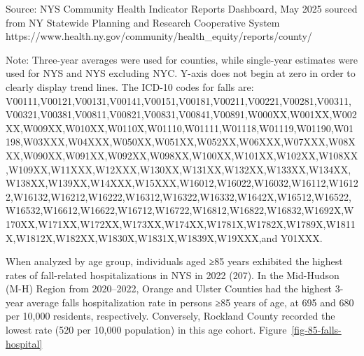 \documentclass[
  english,
  letterpaper,
]{report}
\begin{document}
\begin{tcolorbox}[enhanced jigsaw, breakable, leftrule=.75mm, title=\textcolor{quarto-callout-note-color}{\faInfo}\hspace{0.5em}{Source}, bottomrule=.15mm, opacityback=0, left=2mm, colback=white, bottomtitle=1mm, coltitle=black, colbacktitle=quarto-callout-note-color!10!white, colframe=quarto-callout-note-color-frame, opacitybacktitle=0.6, toptitle=1mm, titlerule=0mm, arc=.35mm, rightrule=.15mm, toprule=.15mm]

Source: NYS Community Health Indicator Reports Dashboard, May 2025
sourced from NY Statewide Planning and Research Cooperative System
https://www.health.ny.gov/community/health\_equity/reports/county/

\end{tcolorbox}

\begin{tcolorbox}[enhanced jigsaw, breakable, leftrule=.75mm, title=\textcolor{quarto-callout-note-color}{\faInfo}\hspace{0.5em}{Note}, bottomrule=.15mm, opacityback=0, left=2mm, colback=white, bottomtitle=1mm, coltitle=black, colbacktitle=quarto-callout-note-color!10!white, colframe=quarto-callout-note-color-frame, opacitybacktitle=0.6, toptitle=1mm, titlerule=0mm, arc=.35mm, rightrule=.15mm, toprule=.15mm]

Note: Three-year averages were used for counties, while single-year
estimates were used for NYS and NYS excluding NYC. Y-axis does not begin
at zero in order to clearly display trend lines. The ICD-10 codes for
falls are:
V00111,V00121,V00131,V00141,V00151,V00181,V00211,V00221,V00281,V00311,V00321,V00381,V00811,V00821,V00831,V00841,V00891,W000XX,W001XX,W002XX,W009XX,W010XX,W0110X,W01110,W01111,W01118,W01119,W01190,W01198,W03XXX,W04XXX,W050XX,W051XX,W052XX,W06XXX,W07XXX,W08XXX,W090XX,W091XX,W092XX,W098XX,W100XX,W101XX,W102XX,W108XX,W109XX,W11XXX,W12XXX,W130XX,W131XX,W132XX,W133XX,W134XX,W138XX,W139XX,W14XXX,W15XXX,W16012,W16022,W16032,W16112,W16122,W16132,W16212,W16222,W16312,W16322,W16332,W1642X,W16512,W16522,W16532,W16612,W16622,W16712,W16722,W16812,W16822,W16832,W1692X,W170XX,W171XX,W172XX,W173XX,W174XX,W1781X,W1782X,W1789X,W1811X,W1812X,W182XX,W1830X,W1831X,W1839X,W19XXX,and
Y01XXX.

\end{tcolorbox}

When analyzed by age group, individuals aged ≥85 years exhibited the
highest rates of fall-related hospitalizations in NYS in 2022 (207). In
the Mid-Hudson (M-H) Region from 2020--2022, Orange and Ulster Counties
had the highest 3-year average falls hospitalization rate in persons ≥85
years of age, at 695 and 680 per 10,000 residents, respectively.
Conversely, Rockland County recorded the lowest rate (520 per 10,000
population) in this age cohort. Figure~\ref{fig-85-falls-hospital}
\end{document}
